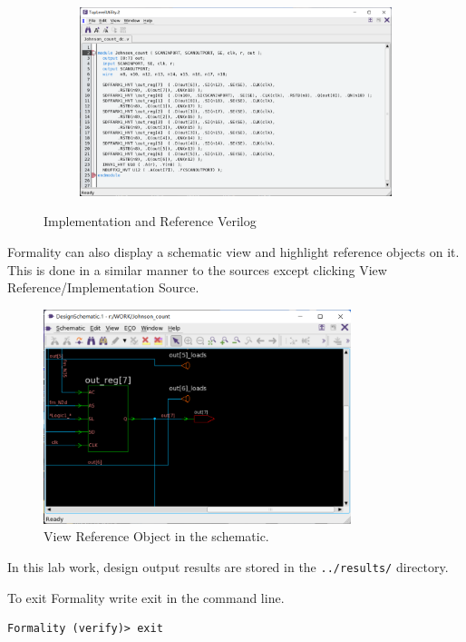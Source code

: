 \documentclass[a4paper,12pt,twoside]{article}
\begin{document}
\begin{figure}[H]\ContinuedFloat
    \centering
    \begin{subfigure}{\textwidth}
        \includegraphics[width=\textwidth]{images/55.png}
    \end{subfigure}
    \caption{Implementation and Reference Verilog}
\end{figure}
Formality can also display a schematic view and highlight reference objects on it. This is done in a similar manner to the sources except clicking View Reference/Implementation Source.
\begin{figure}[H]
    \centering
    \includegraphics[width=0.8\textwidth]{images/56.png}
    \caption{View Reference Object in the schematic.}
\end{figure}
In this lab work, design output results are stored in the \texttt{../results/} directory.

To exit Formality write exit in the command line.
\begin{verbatim}
Formality (verify)> exit
\end{verbatim}
\end{document}
